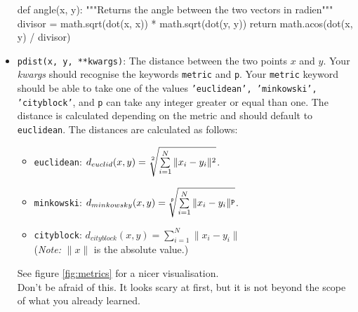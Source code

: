 \begin{itemize}
{\begin{python}
def angle(x, y):
    """Returns the angle between the two vectors in radien"""
    divisor = math.sqrt(dot(x, x)) * math.sqrt(dot(y, y))
    return math.acos(dot(x, y) / divisor)
	\end{python}}
  \item \texttt{pdist(x, y, **kwargs)}: The distance between the two points $x$ and $y$. Your \textit{kwargs} should recognise the keywords \texttt{metric} and \texttt{p}. Your \texttt{metric} keyword should be able to take one of the values \texttt{'euclidean', 'minkowski', 'cityblock'}, and \texttt{p} can take any integer greater or equal than one. The distance is calculated depending on the metric and should default to \texttt{euclidean}. The distances are calculated as follows:
    \begin{itemize}
      \item \texttt{euclidean}: $d_{euclid} (x,y) = \sqrt[\uproot{2}2]{\sum\limits_{i=1}^N \|x_i-y_i\|^2}$.
      \item \texttt{minkowski}: $d_{minkowsky} (x,y) = \sqrt[\uproot{2}\texttt{p}]{\sum\limits_{i=1}^N \|x_i-y_i\|^\texttt{p}}$.
      \item \texttt{cityblock}: $d_{cityblock} (x,y) = \sum\limits_{i=1}^N \|x_i-y_i\|$\\
      (\emph{Note:} $\|x\|$ is the absolute value.)
    \end{itemize}
    See figure \ref{fig:metrics} for a nicer visualisation.\\
    Don't be afraid of this. It looks scary at first, but it is not beyond the scope of what you already learned.
\cprotect{}
\end{itemize}
